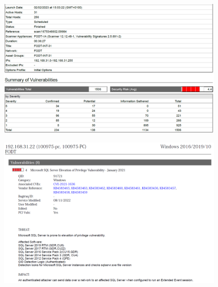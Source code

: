 \documentclass[target=bach,aauheader=]{thud}
\begin{document}
\begin{figure}[h]
    \centering
    \includegraphics[width=1\linewidth]{images/FODT-INT-31_1.png}
    \caption{}
    \label{fig:fodt-int-31_1}
\end{figure}

\pagebreak

\begin{figure}[h]
    \centering
    \includegraphics[width=1\linewidth]{images/FODT-INT-31_2.png}
    \caption{}
    \label{fig:fodt-int-31_2}
\end{figure}

\pagebreak

\backmatter



\end{document}
